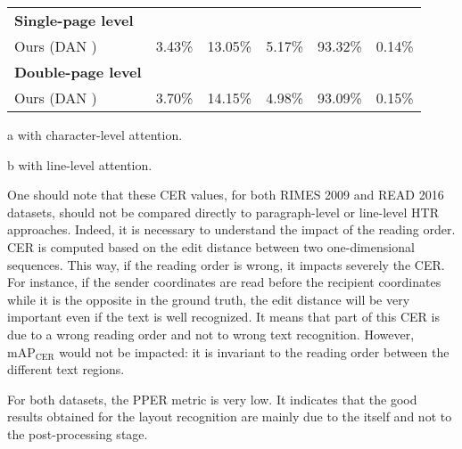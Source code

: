 \begin{table*}[ht]
{\begin{threeparttable}[b]
\begin{tabular}{ l c c c c c}
        \textbf{Single-page level}\\
        Ours (DAN\tnote{a} ) & 3.43\% & 13.05\% & 5.17\% & 93.32\% & 0.14\%\\
        \textbf{Double-page level}\\
        Ours (DAN\tnote{a} ) & 3.70\% & 14.15\% & 4.98\% & 93.09\% & 0.15\%\\
        \hline
        \end{tabular}
        \begin{tablenotes}
            \item [a] with character-level attention.
            \item [b] with line-level attention.
        \end{tablenotes}
    \end{threeparttable}
    }
    \label{table:read}
\end{table*}


One should note that these CER values, for both RIMES 2009 and READ 2016 datasets, should not be compared directly to paragraph-level or line-level HTR approaches. Indeed, it is necessary to understand the impact of the reading order. CER is computed based on the edit distance between two one-dimensional sequences. This way, if the reading order is wrong, it impacts severely the CER. For instance, if the sender coordinates are read before the recipient coordinates while it is the opposite in the ground truth, the edit distance will be very important even if the text is well recognized. It means that part of this CER is due to a wrong reading order and not to wrong text recognition.
However, $\mathrm{mAP}_\mathrm{CER}$ would not be impacted: it is invariant to the reading order between the different text regions.

For both datasets, the PPER metric is very low. It indicates that the good results obtained for the layout recognition are mainly due to the \modelacc{} itself and not to the post-processing stage.

